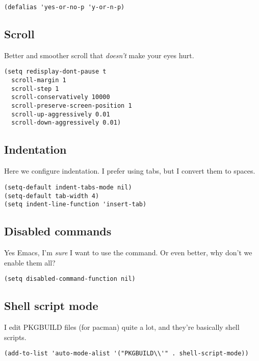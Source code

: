 \documentclass[11pt]{article}
\begin{document}
\begin{verbatim}
(defalias 'yes-or-no-p 'y-or-n-p)
\end{verbatim}

\subsection*{Scroll}
\label{sec:orgf320b59}

Better and smoother scroll that \emph{doesn't} make your eyes hurt.

\begin{verbatim}
(setq redisplay-dont-pause t
  scroll-margin 1
  scroll-step 1
  scroll-conservatively 10000
  scroll-preserve-screen-position 1
  scroll-up-aggressively 0.01
  scroll-down-aggressively 0.01)
\end{verbatim}

\subsection*{Indentation}
\label{sec:org3f3383b}

Here we configure indentation. I prefer using tabs, but I convert them to spaces.

\begin{verbatim}
(setq-default indent-tabs-mode nil)
(setq-default tab-width 4)
(setq indent-line-function 'insert-tab)
\end{verbatim}

\subsection*{Disabled commands}
\label{sec:orgfe49287}

Yes Emacs, I'm \emph{sure} I want to use the command. Or even better, why don't we enable them all?

\begin{verbatim}
(setq disabled-command-function nil)
\end{verbatim}

\subsection*{Shell script mode}
\label{sec:orgc4950f2}

I edit PKGBUILD files (for pacman) quite a lot, and they're basically shell scripts.

\begin{verbatim}
(add-to-list 'auto-mode-alist '("PKGBUILD\\'" . shell-script-mode))
\end{verbatim}
\end{document}

